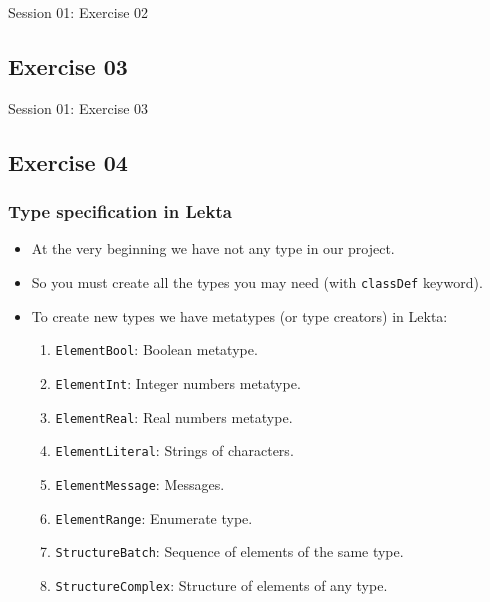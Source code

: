 \documentclass[11pt]{beamer}
\begin{document}
\begin{frame}[fragile]
\Huge
\begin{center}
Session 01: Exercise 02
\end{center}
\end{frame}

\subsection{Exercise 03}

\begin{frame}[fragile]
\Huge
\begin{center}
Session 01: Exercise 03
\end{center}
\end{frame}

\subsection{Exercise 04}

\begin{frame}[fragile]
\frametitle{Type specification in Lekta}
\begin{itemize}
	\item At the very beginning we have not any type in our project.
	\pause
	\item So you must create all the types you may need (with \texttt{classDef} keyword).
	\pause
	\item To create new types we have metatypes (or type creators) in Lekta:
	\begin{enumerate}
		\item \texttt{ElementBool}: Boolean metatype.
		\item \texttt{ElementInt}: Integer numbers metatype.
		\item \texttt{ElementReal}: Real numbers metatype.
		\item \texttt{ElementLiteral}: Strings of characters.
		\item \texttt{ElementMessage}: Messages.
		\item \texttt{ElementRange}: Enumerate type.
		\item \texttt{StructureBatch}: Sequence of elements of the same type.
		\item \texttt{StructureComplex}: Structure of elements of any type.
	\end{enumerate}
\end{itemize}
\end{frame}
\end{document}
